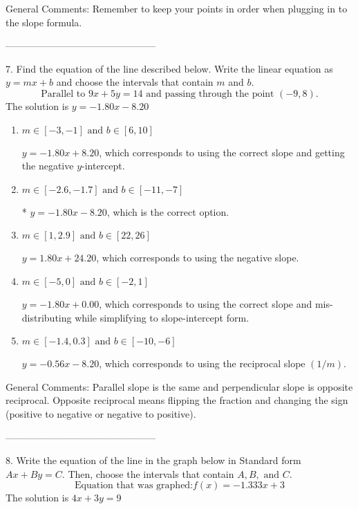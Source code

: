 \documentclass{extbook}[14pt]
\begin{document}
General Comments: Remember to keep your points in order when plugging in to the slope formula.

-----------------------------------------------

7. Find the equation of the line described below. Write the linear equation as $ y=mx+b $ and choose the intervals that contain $m$ and $b$.
\[ \text{Parallel to } 9 x + 5 y = 14 \text{ and passing through the point } (-9, 8). \] 
The solution is $ y = -1.80x - 8.20 $ 

\begin{enumerate}[label=\Alph*.] 
\item $ m \in [-3, -1] \text{ and } b \in [6, 10] $ 

  $y = -1.80x + 8.20$, which corresponds to using the correct slope and getting the negative $y$-intercept. 
\item $ m \in [-2.6, -1.7] \text{ and } b \in [-11, -7] $ 

 * $y = -1.80x - 8.20$, which is the correct option. 
\item $ m \in [1, 2.9] \text{ and } b \in [22, 26] $ 

  $y = 1.80x + 24.20$, which corresponds to using the negative slope. 
\item $ m \in [-5, 0] \text{ and } b \in [-2, 1] $ 

  $y = -1.80x + 0.00$, which corresponds to using the correct slope and mis-distributing while simplifying to slope-intercept form. 
\item $ m \in [-1.4, 0.3] \text{ and } b \in [-10, -6] $ 

  $y = -0.56x - 8.20$, which corresponds to using the reciprocal slope $(1/m)$. 
\end{enumerate} 
 
General Comments: Parallel slope is the same and perpendicular slope is opposite reciprocal. Opposite reciprocal means flipping the fraction and changing the sign (positive to negative or negative to positive).

-----------------------------------------------

8. Write the equation of the line in the graph below in Standard form $Ax+By=C$. Then, choose the intervals that contain $A, B, \text{ and } C$.
\[ \text{Equation that was graphed:} f(x)= -1.333 x + 3 \] 
The solution is $ 4 x + 3 y = 9 $ 
\end{document}
